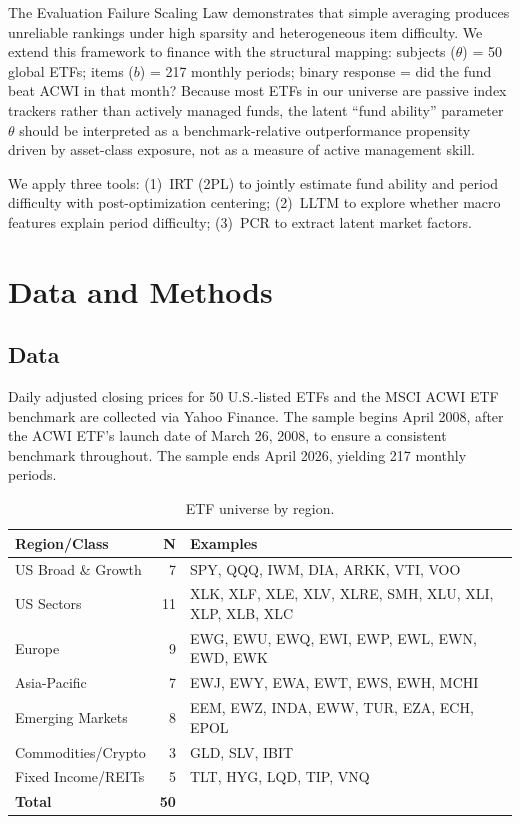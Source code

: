 \documentclass[11pt,a4paper]{article}
\begin{document}
The Evaluation Failure Scaling Law \citep{kang2026efsl} demonstrates that simple averaging produces unreliable rankings under high sparsity and heterogeneous item difficulty. We extend this framework to finance with the structural mapping: subjects ($\theta$) = 50 global ETFs; items ($b$) = 217 monthly periods; binary response = did the fund beat ACWI in that month? Because most ETFs in our universe are passive index trackers rather than actively managed funds, the latent ``fund ability'' parameter $\theta$ should be interpreted as a benchmark-relative outperformance propensity driven by asset-class exposure, not as a measure of active management skill.

We apply three tools: (1)~IRT (2PL) to jointly estimate fund ability and period difficulty with post-optimization centering; (2)~LLTM to explore whether macro features explain period difficulty; (3)~PCR to extract latent market factors.

\section{Data and Methods}

\subsection{Data}

Daily adjusted closing prices for 50 U.S.-listed ETFs and the MSCI ACWI ETF benchmark are collected via Yahoo Finance. The sample begins April 2008, after the ACWI ETF's launch date of March 26, 2008, to ensure a consistent benchmark throughout. The sample ends April 2026, yielding 217 monthly periods.

\begin{table}[H]
\centering\small
\caption{ETF universe by region.}
\label{tab:universe}
\begin{tabular}{@{}lrl@{}}
\toprule
\textbf{Region/Class} & \textbf{N} & \textbf{Examples} \\
\midrule
US Broad \& Growth   & 7  & SPY, QQQ, IWM, DIA, ARKK, VTI, VOO \\
US Sectors           & 11 & XLK, XLF, XLE, XLV, XLRE, SMH, XLU, XLI, XLP, XLB, XLC \\
Europe               & 9  & EWG, EWU, EWQ, EWI, EWP, EWL, EWN, EWD, EWK \\
Asia-Pacific         & 7  & EWJ, EWY, EWA, EWT, EWS, EWH, MCHI \\
Emerging Markets     & 8  & EEM, EWZ, INDA, EWW, TUR, EZA, ECH, EPOL \\
Commodities/Crypto   & 3  & GLD, SLV, IBIT \\
Fixed Income/REITs   & 5  & TLT, HYG, LQD, TIP, VNQ \\
\midrule
\textbf{Total}       & \textbf{50} & \\
\bottomrule
\end{tabular}
\end{table}
\end{document}

